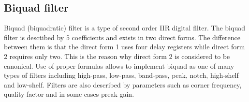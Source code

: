 \documentclass[a4paper,twoside,12pt]{book}
\begin{document}
\subsection{Biquad filter}
Biquad (biquadratic) filter is a type of second order IIR digital filter.
The biquad filter is desctibed by 5 coefficients and exists in two direct forms.
The difference between them is that the direct form 1 uses four delay registers
while direct form 2 requires only two.
This is the reason why direct form 2 is considered to be canonical.
Use of proper formulas allows to implement biquad as one of many types of filters
including high-pass, low-pass, band-pass, peak, notch, high-shelf and low-shelf.
Filters are also described by parameters such as corner frequency, quality factor
and in some cases preak gain.
\cite{Biquad}
\cite{biquad_web}
\end{document}
